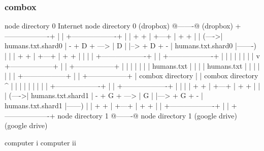 \begin{frame}[fragile]
  \frametitle{combox}

  {\tiny
  \begin{semiverbatim}

         node directory 0                Internet              node directory 0
         (dropbox)                       @-------@             (dropbox)
        +-------------------+            |       |            +-------------------+
        |                   |    + +     | +---+ |     + +    |                   |
  (---->| humans.txt.shard0 | - + D + ---> | D | |--> + D + - | humans.txt.shard0 |-------)
  |     |                   |    + +     | +---+ |     + +    |                   |       |
  |     +-------------------+            |       |            +-------------------+       |
  |                                      |       |                                        |
  |                                      |       |                                        v
 +------------------+                    |       |                        +-----------------+
 |                  |                    |       |                        |                 |
 |  humans.txt      |                    |       |                        | humans.txt      |
 |                  |                    |       |                        |                 |
 +------------------+                    |       |                        +-----------------+
  |  combox directory                    |       |                      combox directory  ^
  |                                      |       |                                        |
  |                                      |       |                                        |
  |     +-------------------+            |       |             +-------------------+      |
  |     |                   |    + +     | +---+ |      + +    |                   |      |
  (---->| humans.txt.shard1 | - + G + ---> | G | |---> + G + - | humans.txt.shard1 |------)
        |                   |    + +     | +---+ |      + +    |                   |
        +-------------------+            |       |             +-------------------+
         node directory 1                @-------@              node directory 1
         (google drive)                                         (google drive)

  computer i                                                                    computer ii
  \end{semiverbatim}
  }

\end{frame}

